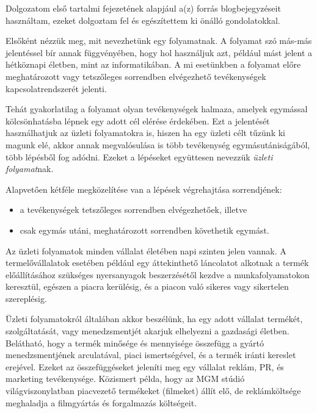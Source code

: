 

Dolgozatom első tartalmi fejezetének alapjául a(z) \cite{xflower} forrás blogbejegyzéseit használtam, ezeket dolgoztam fel és egészítettem ki önálló gondolatokkal.


Elsőként nézzük meg, mit nevezhetünk egy folyamatnak. A folyamat szó más-más jelentéssel bír annak függvényében, hogy hol használjuk azt, például mást jelent a hétköznapi életben, mint az informatikában. A mi esetünkben a folyamat előre meghatározott vagy tetszőleges sorrendben elvégezhető tevékenységek kapcsolatrendszerét jelenti.

Tehát gyakorlatilag a folyamat olyan tevékenységek halmaza, amelyek egymással kölcsönhatásba lépnek egy adott cél elérése érdekében. Ezt a jelentését használhatjuk az üzleti folyamatokra is, hiszen ha egy üzleti célt tűzünk ki magunk elé, akkor annak megvalósulása is több tevékenység egymásutániságából, több lépésből fog adódni. Ezeket a lépéseket együttesen nevezzük \textit{üzleti folyamat}nak.

Alapvetően kétféle megközelítése van a lépések végrehajtása sorrendjének:
\begin{itemize}
\item a tevékenységek tetszőleges sorrendben elvégezhetőek, illetve
\item csak egymás utáni, meghatározott sorrendben követhetik egymást.
\end{itemize}

Az üzleti folyamatok minden vállalat életében napi szinten jelen vannak. A termelővállalatok esetében például egy áttekinthető láncolatot alkotnak a termék előállításához szükséges nyersanyagok beszerzésétől kezdve a munkafolyamatokon keresztül, egészen a piacra kerülésig, és a piacon való sikeres vagy sikertelen szereplésig.

Üzleti folyamatokról általában akkor beszélünk, ha egy adott vállalat termékét, szolgáltatását, vagy menedzsmentjét akarjuk elhelyezni a gazdasági életben. Belátható, hogy a termék minősége és mennyisége összefügg a gyártó menedzsmentjének arculatával, piaci ismertségével, és a termék iránti kereslet erejével. Ezeket az összefüggéseket jeleníti meg egy vállalat reklám, PR, és marketing tevékenysége. Közismert példa, hogy az MGM stúdió világviszonylatban piacvezető termékeket (filmeket) állít elő, de reklámköltsége meghaladja a filmgyártás és forgalmazás költségeit.

